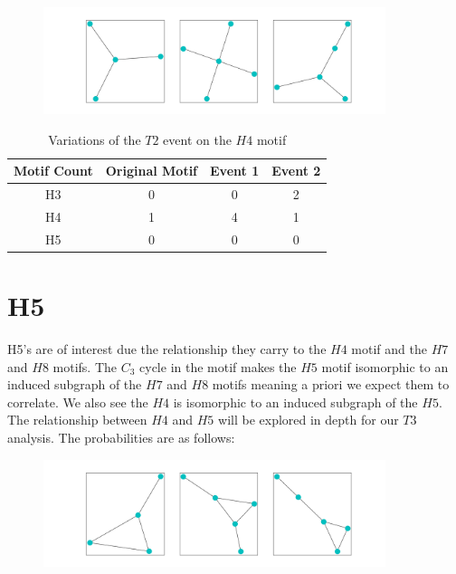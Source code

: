 \vspace{3mm}

\begin{figure}[!ht]
    \includegraphics[width=10cm]{Images/H4_evolution.png}
    \centering
\end{figure}

\begin{table}[h!]
    \centering
    \begin{tabular}{||c c c c||} 
    \hline
    Motif Count & Original Motif & Event 1 & Event 2\\ [0.5ex] 
    \hline\hline
    H3 & 0 & 0 & 2\\ 
    \hline
    H4 & 1 & 4 & 1\\
    \hline
    H5 & 0 & 0 & 0\\
    \hline
   \end{tabular}
   \caption{Variations of the $T2$ event on the $H4$ motif}
    \label{table:2}
\end{table}


\FloatBarrier


\section{H5}
H5's are of interest due the relationship they carry to the $H4$ motif and the 
$H7$ and $H8$ motifs. The $C_3$ cycle in the motif makes the $H5$ motif isomorphic to
an induced subgraph of the $H7$ and $H8$ motifs meaning a priori we expect them to correlate. We 
also see the $H4$ is isomorphic to an induced subgraph of the $H5$. The relationship between
$H4$ and $H5$ will be explored in depth for our $T3$ analysis. The probabilities are as follows:



\begin{figure}[!ht]
    \includegraphics[width=10cm]{Images/H5_evolution.png}
    \centering
\end{figure}
\FloatBarrier

